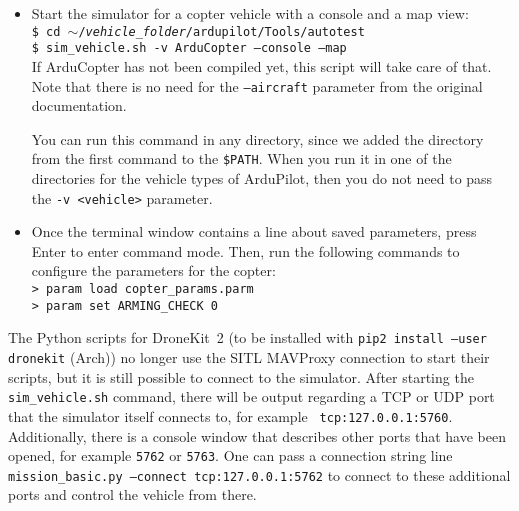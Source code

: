 \documentclass{article}
\newcommand{\arch}{{\color{red} (Arch)}}
\begin{document}
\begin{itemize}
    \item Start the simulator for a copter vehicle with a console and a map 
          view: \\
          {\tt \$ cd $\sim$/\emph{vehicle\_folder}/ardupilot/Tools/autotest} \\
          {\tt \$ sim\_vehicle.sh -v ArduCopter --console --map} \\
          If ArduCopter has not been compiled yet, this script will take care 
          of that. Note that there is no need for the {\tt --aircraft} 
          parameter from the original documentation.

          You can run this command in any directory, since we added the 
          directory from the first command to the {\tt \$PATH}. When you run it 
          in one of the directories for the vehicle types of ArduPilot, then 
          you do not need to pass the {\tt -v <vehicle>} parameter.
    \item Once the terminal window contains a line about saved parameters, 
          press Enter to enter command mode. Then, run the following commands 
          to configure the parameters for the copter: \\
          {\tt > param load copter\_params.parm} \\
          {\tt > param set ARMING\_CHECK 0}
\end{itemize}

\vspace{0.4cm}

The Python scripts for DroneKit~2 (to be installed with {\tt pip2 install 
--user dronekit} \arch{}) no longer use the SITL MAVProxy connection to start 
their scripts, but it is still possible to connect to the simulator. After 
starting the {\tt sim\_vehicle.sh} command, there will be output regarding a 
TCP or UDP port that the simulator itself connects to, for example {\tt 
tcp:127.0.0.1:5760}. Additionally, there is a console window that describes 
other ports that have been opened, for example {\tt 5762} or {\tt 5763}. One 
can pass a connection string line {\tt mission\_basic.py --connect 
tcp:127.0.0.1:5762} to connect to these additional ports and control the 
vehicle from there.
\end{document}
